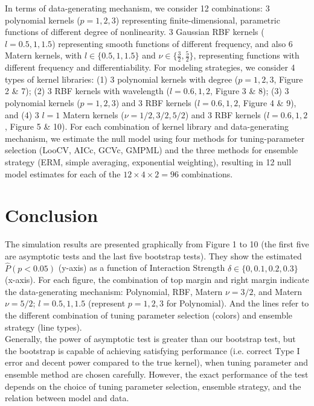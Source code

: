 \documentclass[11pt]{article}
\begin{document}
In terms of data-generating mechanism, we consider 12 combinations: 3 polynomial kernels ($p=1, 2, 3$) representing finite-dimensional, parametric functions of different degree of nonlinearity. 3 Gaussian RBF kernels ($l=0.5, 1, 1.5$) representing smooth functions of different frequency, and also 6 Matern kernels, with $l \in \{0.5, 1, 1.5\}$ and $\nu \in \{\frac{3}{2}, \frac{5}{2}\}$, representing functions with different frequency and differentiability. For modeling strategies, we consider 4 types of kernel libraries: (1) 3 polynomial kernels with degree ($p=1, 2, 3$, Figure 2 \& 7); (2) 3 RBF kernels with wavelength ($l=0.6, 1, 2$, Figure 3 \& 8); (3) 3 polynomial kernels ($p=1, 2, 3$) and 3 RBF kernels ($l=0.6, 1, 2$, Figure 4 \& 9), and (4) 3 $l=1$ Matern kernels ($\nu=1/2, 3/2, 5/2$) and 3 RBF kernels ($l=0.6, 1, 2$, Figure 5 \& 10). For each combination of kernel library and data-generating mechanism, we estimate the null model using four methods for tuning-parameter selection (LooCV, AICc, GCVc, GMPML) and the three methods for ensemble strategy (ERM, simple averaging, exponential weighting), resulting in 12 null model estimates for each of the $12 \times 4 \times 2 = 96$ combinations.

\section{{\bf Conclusion}}
The simulation results are presented graphically from Figure 1 to 10 (the first five are asymptotic tests and the last five bootstrap tests). They show the estimated $\hat{P}(p<0.05)$ (y-axis) as a function of Interaction Strength $\delta \in \{0, 0.1, 0.2, 0.3\}$ (x-axis). For each figure, the combination of top margin and right margin indicate the data-generating mechanism: Polynomial, RBF, Matern $\nu=3/2$, and Matern $\nu=5/2$; $l=0.5, 1, 1.5$ (represent $p=1, 2, 3$ for Polynomial). And the lines refer to the different combination of tuning parameter selection (colors) and ensemble strategy (line types).\\

Generally, the power of asymptotic test is greater than our bootstrap test, but the bootstrap is capable of achieving satisfying performance (i.e. correct Type I error and decent power compared to the true kernel), when tuning parameter and ensemble method are chosen carefully. However, the exact performance of the test depends on the choice of tuning parameter selection, ensemble strategy, and the relation between model and data.\\
\end{document}
